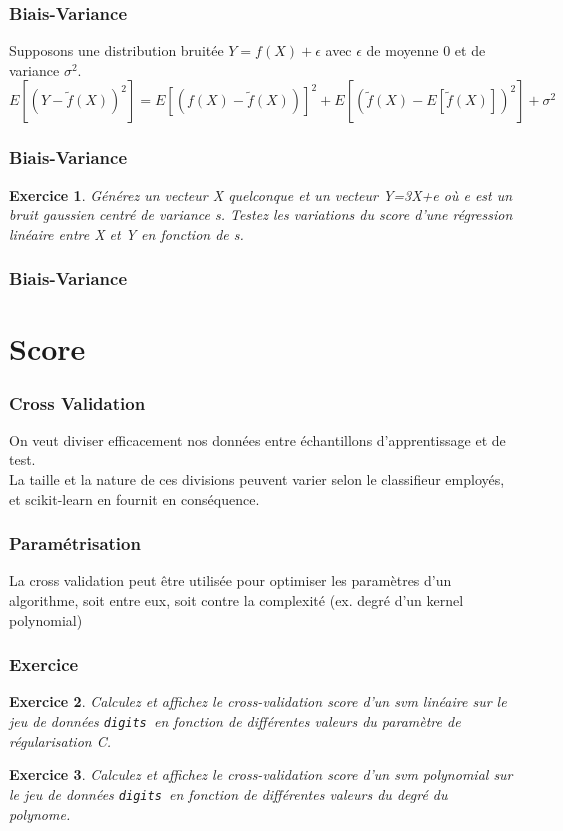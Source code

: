 \documentclass[11pt]{beamer}
\newenvironment{slide}[1]{%
\begin{frame}[environment=slide]
\frametitle{#1}
}{%
\end{frame}
}
\newtheorem{exercice}{Exercice}
\newcommand{\Python}[1]{
	{\small	}
}
\begin{document}
\begin{slide}{Biais-Variance}
Supposons une distribution bruitée $Y = f(X)+\epsilon$ avec $\epsilon$ de moyenne 0 et de variance $\sigma^2$.\\
\pause
$$E [(Y-{\tilde{f}}(X))^{2}] = E [(f(X)-{\tilde{f}}(X))]^{2} + E [({\tilde{f}}(X)-E[{\tilde{f}}(X)])^{2}] +\sigma^2$$
\end{slide}

\begin{slide}{Biais-Variance}
\begin{exercice}
Générez un vecteur X quelconque et un vecteur Y=3X+e où e est un bruit gaussien centré de variance s. Testez les variations du score d'une régression linéaire entre X et Y en fonction de s.
\end{exercice}
\end{slide}

\begin{slide}{Biais-Variance}
\Python{ex903}
\end{slide}

\section{Score}

\begin{slide}{Cross Validation}
On veut diviser efficacement nos données entre échantillons d'apprentissage et de test.\\

\vspace{0.2cm} La taille et la nature de ces divisions peuvent varier selon le classifieur employés, et scikit-learn en fournit en conséquence.

\end{slide}

\begin{slide}{Paramétrisation}
La cross validation peut être utilisée pour optimiser les paramètres d'un algorithme, soit entre eux, soit contre la complexité (ex. degré d'un kernel polynomial)
\end{slide}

\begin{slide}{Exercice}
\begin{exercice}
Calculez et affichez le cross-validation score d'un svm linéaire sur le jeu de données \texttt{digits}~en fonction de différentes valeurs du paramètre de régularisation C.
\end{exercice}
\begin{exercice}
Calculez et affichez le cross-validation score d'un svm polynomial sur le jeu de données \texttt{digits}~en fonction de différentes valeurs du degré du polynome.
\end{exercice}
\end{slide}
\end{document}
